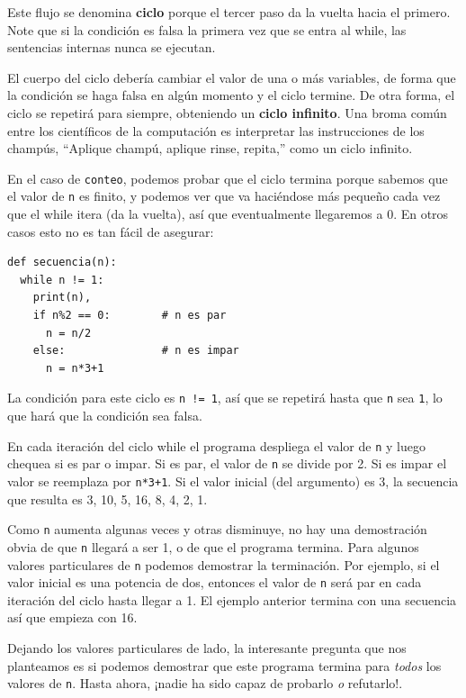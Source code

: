 Este flujo se denomina \textbf{ciclo} porque el tercer paso da la
vuelta hacia el primero. Note que si la condición es falsa la primera
vez que se entra al while, las sentencias internas nunca se ejecutan.

   
 

El cuerpo del ciclo debería cambiar el valor de una o más variables,
de forma que la condición se haga falsa en algún momento y el ciclo
termine. De otra forma, el ciclo se repetirá para siempre, obteniendo
un \textbf{ciclo infinito}. Una broma común entre los científicos
de la computación es interpretar las instrucciones de los champús,
``Aplique champú, aplique rinse, repita,'' como un ciclo infinito.

En el caso de \texttt{conteo}, podemos probar que el ciclo termina
porque sabemos que el valor de \texttt{n} es finito, y podemos ver
que va haciéndose más pequeño cada vez que el while itera (da la vuelta),
así que eventualmente llegaremos a 0. En otros casos esto no es tan
fácil de asegurar:

\begin{verbatim}
def secuencia(n):
  while n != 1:
    print(n),
    if n%2 == 0:        # n es par
      n = n/2
    else:               # n es impar
      n = n*3+1
\end{verbatim}
 La condición para este ciclo es \texttt{n != 1}, así que se repetirá
hasta que \texttt{n} sea \texttt{1}, lo que hará que la condición
sea falsa.

En cada iteración del ciclo while el programa despliega el valor de
\texttt{n} y luego chequea si es par o impar. Si es par, el valor
de \texttt{n} se divide por 2. Si es impar el valor se reemplaza por
\texttt{n{*}3+1}. Si el valor inicial (del argumento) es 3, la secuencia
que resulta es 3, 10, 5, 16, 8, 4, 2, 1.

Como \texttt{n} aumenta algunas veces y otras disminuye, no hay una
demostración obvia de que \texttt{n} llegará a ser 1, o de que el
programa termina. Para algunos valores particulares de \texttt{n}
podemos demostrar la terminación. Por ejemplo, si el valor inicial
es una potencia de dos, entonces el valor de \texttt{n} será par en
cada iteración del ciclo hasta llegar a 1. El ejemplo anterior termina
con una secuencia así que empieza con 16.

Dejando los valores particulares de lado, la interesante pregunta
que nos planteamos es si podemos demostrar que este programa termina
para {\em todos} los valores de \texttt{n}. Hasta ahora, ¡nadie
ha sido capaz de probarlo {\em o} refutarlo!.

